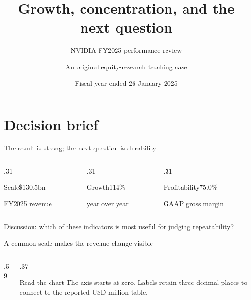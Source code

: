 \documentclass[11pt,aspectratio=169]{beamer}
\title[NVIDIA FY2025]{Growth, concentration, and the next question}
\subtitle{NVIDIA FY2025 performance review}
\author[Research workshop]{An original equity-research teaching case}
\institute[Teaching case]{Historical reporting exercise}
\date[FY2025]{Fiscal year ended 26 January 2025}
\begin{document}
\begin{frame}[plain]\titlepage\end{frame}
\section{Decision brief}
\begin{frame}{The result is strong; the next question is durability}
\begin{columns}[T,onlytextwidth]
\begin{column}{.31\textwidth}\begin{block}{Scale}\centering\LARGE\$130.5bn\par\normalsize FY2025 revenue\end{block}\end{column}
\begin{column}{.31\textwidth}\begin{block}{Growth}\centering\LARGE114\%\par\normalsize year over year\end{block}\end{column}
\begin{column}{.31\textwidth}\begin{block}{Profitability}\centering\LARGE75.0\%\par\normalsize GAAP gross margin\end{block}\end{column}
\end{columns}
\medskip
\alert{Discussion:} which of these indicators is most useful for judging repeatability?
\end{frame}
\begin{frame}{A common scale makes the revenue change visible}
\begin{columns}[c]
\begin{column}{.59\textwidth}
\end{column}
\begin{column}{.37\textwidth}
\begin{exampleblock}{Read the chart}
The axis starts at zero. Labels retain three decimal places to connect to the reported USD-million table.
\end{exampleblock}
\end{column}
\end{columns}
\end{frame}
\end{document}
